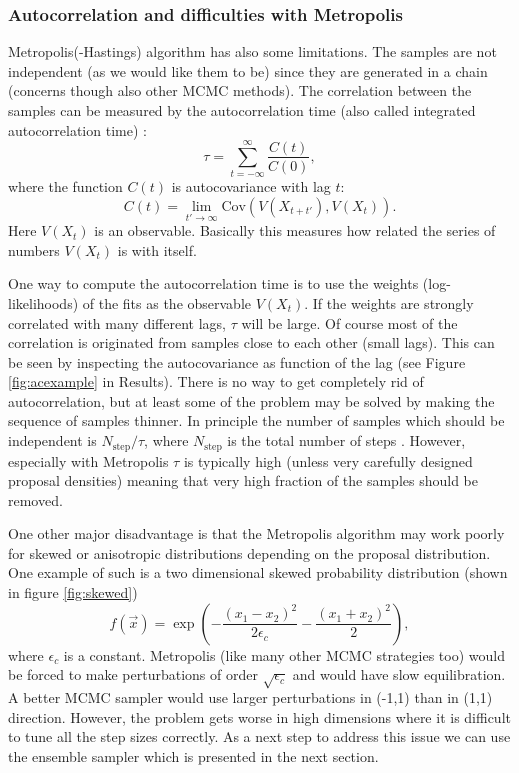 \documentclass{wihuri}
\def\be{\begin{equation}}
\def\ee{\end{equation}}
\begin{document}
\subsubsection{Autocorrelation and difficulties with Metropolis}

Metropolis(-Hastings) algorithm has also some limitations. The samples are not independent (as we would like them to be) since they are generated in a chain (concerns though also other MCMC methods). The correlation between the samples can be measured by the autocorrelation time (also called integrated autocorrelation time) \cite{ensemble1}: 
\be \label{eq:autocorr_time}
\tau = \sum_{t=-\infty}^{\infty} \frac{C(t)}{C(0)} ,
\ee
where the function $C(t)$ is autocovariance with lag $t$:
\be \label{eq:autocovariance}
C(t) = \lim_{t'\to\infty}\mathrm{Cov}(V(X_{t+t'}),V(X_{t})).
\ee
Here $V(X_{t})$ is an observable. Basically this measures how related the series of numbers $V(X_{t})$ is with itself. 

One way to compute the autocorrelation time is to use the weights (log-likelihoods) of the fits as the observable $V(X_{t})$. If the weights are strongly correlated with many different lags, $\tau$ will be large. Of course most of the correlation is originated from samples close to each other (small lags). This can be seen by inspecting the autocovariance as function of the lag (see Figure \ref{fig:acexample} in Results). There is no way to get completely rid of autocorrelation, but at least some of the problem may be solved by making the sequence of samples thinner. In principle the number of samples which should be independent is $N_{\mathrm{step}}/\tau$, where $N_{\mathrm{step}}$ is the total number of steps \cite{kaiser}. However, especially with Metropolis $\tau$ is typically high (unless very carefully designed proposal densities) meaning that very high fraction of the samples should be removed.

One other major disadvantage is that the Metropolis algorithm may work poorly for skewed or anisotropic distributions depending on the proposal distribution. One example of such is a two dimensional skewed probability distribution (shown in figure \ref{fig:skewed})
\be \label{eq:skew} 
f(\vec{x}) = \exp(-\frac{(x_{1}-x_{2})^{2}}{2\epsilon_{c}}-\frac{(x_{1}+x_{2})^{2}}{2}),
\ee
where $\epsilon_{c}$ is a constant. Metropolis (like many other MCMC strategies too) would be forced to make perturbations of order $\sqrt{\epsilon_{c}}$ and would have slow equilibration. A better MCMC sampler would use larger perturbations in (-1,1) than in (1,1) direction. However, the problem gets worse in high dimensions where it is difficult to tune all the step sizes correctly. As a next step to address this issue we can use the ensemble sampler which is presented in the next section. 
\end{document}
